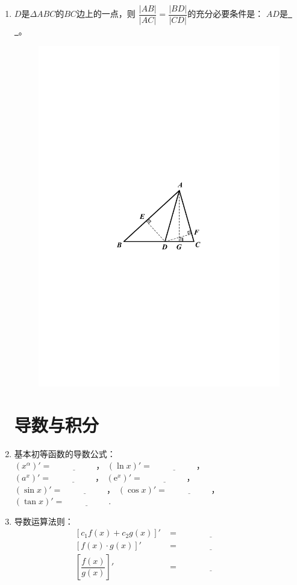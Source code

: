 \documentclass{article}
\newif\ifte
\newcommand{\e}{\mathrm{e}}
\begin{document}
\begin{multicols}{2}
\begin{enumerate}[leftmargin=20pt]
\item $ D $是$ \Delta ABC $的$ BC $边上的一点，则
$ \dfrac{|AB|}{|AC|}=\dfrac{|BD|}{|CD|} $的充分必要条件是：
$ AD $是\underline{\ \ifte $ \angle BAC $的角平分线
    \else \hspace{4cm} \fi\ }。
\begin{figure}[H]
    \centering
    \includegraphics[width=0.3\linewidth]{三角形的内角平分线定理}
\end{figure}


\section{导数与积分}

\item 基本初等函数的导数公式：\\
$ (x^{\alpha})'=\underline{\ \ifte \alpha x^{\alpha-1}
    \else \hspace{2cm} \fi\ } $，
$ (\ln x)'=\underline{\ \ifte \frac{1}{x}\else \hspace{2cm} \fi\ } $，\\
$ (a^x)'=\underline{\ \ifte (\ln a) a^x\else \hspace{2cm} \fi\ } $，
$ (\e^x)'=\underline{\ \ifte \e^x\else \hspace{2cm} \fi\ } $，\\
$ (\sin x)'=\underline{\ \ifte \cos  x\else \hspace{2cm} \fi\ } $，
$ (\cos  x)'=\underline{\ \ifte -\sin x\else \hspace{2cm} \fi\ } $，\\
$ (\tan x)'=\underline{\ \ifte \dfrac{1}{\cos ^2 x}
    \else \hspace{2cm} \fi\ } $.

\item 导数运算法则：
\begin{align*}
\left[c_1f(x)+c_2g(x)\right]'&=\underline{\ \ifte 
    c_1f'(x)+c_2g'(x) \else \hspace{3cm} \fi\ } \\
\left[f(x)\cdot g(x) \right]'&= \underline{\ \ifte 
    f'(x)\cdot g(x)+f(x)\cdot g'(x) \else \hspace{3cm} \fi\ } \\
\left[ \dfrac{f(x)}{g(x)}\right]'&=\underline{\ \ifte 
    \dfrac{f'(x)\cdot g(x)-f(x)\cdot g'(x)}{g^2(x)}
    \else \hspace{3cm} \fi\ }
\end{align*}


\end{enumerate}
\end{multicols}
\end{document}
